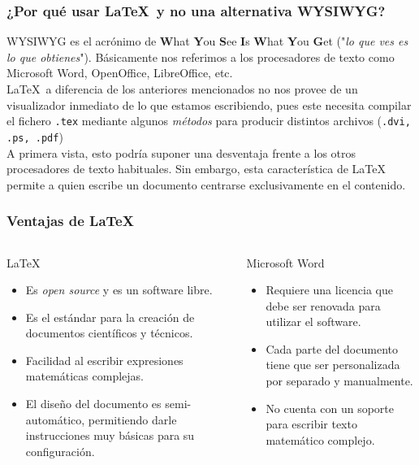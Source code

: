 \documentclass[11pt]{beamer}
\begin{document}
\begin{frame}
\frametitle{¿Por qué usar \LaTeX \, y no una alternativa WYSIWYG?}
WYSIWYG es el acrónimo de \textbf{W}hat \textbf{Y}ou \textbf{S}ee \textbf{I}s \textbf{W}hat \textbf{Y}ou \textbf{G}et ("\!\textit{lo que ves es lo que obtienes}"). Básicamente nos referimos a los procesadores de texto como Microsoft Word, OpenOffice, LibreOffice, etc.\\[20pt]
\LaTeX \, a diferencia de los anteriores mencionados no nos provee de un visualizador inmediato de lo que estamos escribiendo, pues este necesita compilar el fichero \texttt{.tex} mediante algunos \textit{métodos} para producir distintos archivos (\texttt{.dvi, .ps, .pdf})\\[6pt]
A primera vista, esto podría suponer una desventaja frente a los otros procesadores de texto habituales. Sin embargo, esta característica de \LaTeX \, permite a quien escribe un documento centrarse exclusivamente en el contenido.
\end{frame}
\begin{frame}
\frametitle{Ventajas de \LaTeX}
\begin{columns}[t]
\begin{column}{.48\linewidth}
\begin{block}{\LaTeX}
\begin{itemize}
\item Es \textit{open source} y es un software libre.
\item Es el estándar para la creación de documentos científicos y técnicos.
\item Facilidad al escribir expresiones matemáticas complejas.
\item El diseño del documento es semi-automático, permitiendo darle instrucciones muy básicas para su configuración.
\end{itemize}
\end{block}
\end{column}
\begin{column}{.48\linewidth}
\begin{block}{Microsoft Word}
\begin{itemize}
\item Requiere una licencia que debe ser renovada para utilizar el software.
\item Cada parte del documento tiene que ser personalizada por separado y manualmente.
\item No cuenta con un soporte para escribir texto matemático complejo.
\end{itemize}
\end{block}
\end{column}
\end{columns}
\end{frame}
\end{document}
